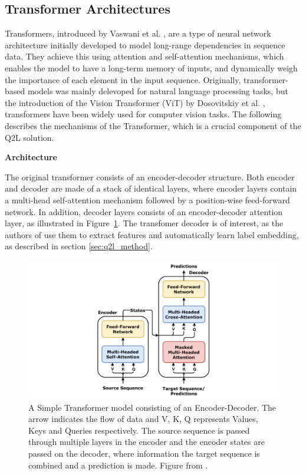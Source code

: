 \documentclass[lettersize,journal]{IEEEtran}
\renewcommand{\paragraph}[1]{%
  \vspace{1.5ex}\textbf{#1}\quad
}
\begin{document}
\subsection{Transformer Architectures}
\label{sec:transformers}
Transformers, introduced by Vaswani et al. \cite{vaswani2023attentionneed}, are a type of neural network architecture initially developed to model long-range dependencies in sequence data. They achieve this using attention and self-attention mechanisms, which enables the model to have a long-term memory of inputs, and dynamically weigh the importance of each element in the input sequence. Originally, transformer-based models was mainly delevoped for natural language processing tasks, but the introduction of the Vision Transformer (ViT) by Dosovitskiy et al. \cite{dosovitskiy2021imageworth16x16words}, transformers have been widely used for computer vision tasks. The following describes the mechanisms of the Transformer, which is a crucial component of the Q2L solution.


\paragraph{Architecture}
The original transformer consists of an encoder-decoder structure. Both encoder and decoder are made of a stack of identical layers, where encoder layers contain a multi-head self-attention mechanism followed by a position-wise feed-forward network. In addition, decoder layers consists of an encoder-decoder attention layer, as illustrated in Figure~\ref{fig:encoder_decoder}. The transfomer decoder is of interest, as the authors of \cite{Query2Label} use them to extract features and automatically learn label embedding, as described in section \ref{sec:q2l_method}.

\begin{figure}[t]
    \centering
    \includegraphics[width=\linewidth]{images/Transformer,_one_encoder-decoder_block.png}
    \caption{A Simple Transformer model consisting of an Encoder-Decoder. The arrow indicates the flow of data and V, K, Q represents Values, Keys and Queries respectively. The source sequence is passed through multiple layers in the encoder and the encoder states are passed on the decoder, where information the target sequence is combined and a prediction is made. Figure from \cite{godoy_dl_visuals}.}
    \label{fig:encoder_decoder}
\end{figure}
\end{document}

